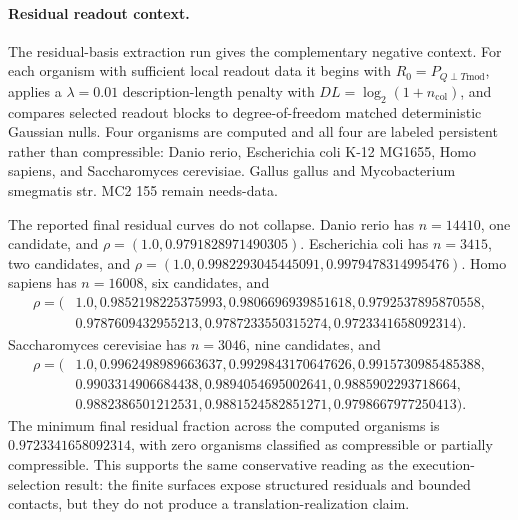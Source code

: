 \paragraph{Residual readout context.}
The residual-basis extraction run gives the complementary negative context.  For each organism with sufficient local readout data it begins with $R_0=P_{Q\perp T\mathrm{mod}}$, applies a $\lambda=0.01$ description-length penalty with $DL=\log_2(1+n_{\mathrm{col}})$, and compares selected readout blocks to degree-of-freedom matched deterministic Gaussian nulls.  Four organisms are computed and all four are labeled persistent rather than compressible: Danio rerio, Escherichia coli K-12 MG1655, Homo sapiens, and Saccharomyces cerevisiae.  Gallus gallus and Mycobacterium smegmatis str. MC2 155 remain needs-data.

The reported final residual curves do not collapse.  Danio rerio has $n=14410$, one candidate, and $\rho=(1.0,0.9791828971490305)$.  Escherichia coli has $n=3415$, two candidates, and $\rho=(1.0,0.9982293045445091,0.9979478314995476)$.  Homo sapiens has $n=16008$, six candidates, and
$$
\begin{aligned}
\rho = (&1.0,0.9852198225375993,0.9806696939851618,0.9792537895870558,\\
&0.9787609432955213,0.9787233550315274,0.9723341658092314).
\end{aligned}
$$
Saccharomyces cerevisiae has $n=3046$, nine candidates, and
$$
\begin{aligned}
\rho = (&1.0,0.9962498989663637,0.9929843170647626,0.9915730985485388,\\
&0.9903314906684438,0.9894054695002641,0.9885902293718664,\\
&0.9882386501212531,0.9881524582851271,0.9798667977250413).
\end{aligned}
$$
The minimum final residual fraction across the computed organisms is $0.9723341658092314$, with zero organisms classified as compressible or partially compressible.  This supports the same conservative reading as the execution-selection result: the finite surfaces expose structured residuals and bounded contacts, but they do not produce a translation-realization claim.

